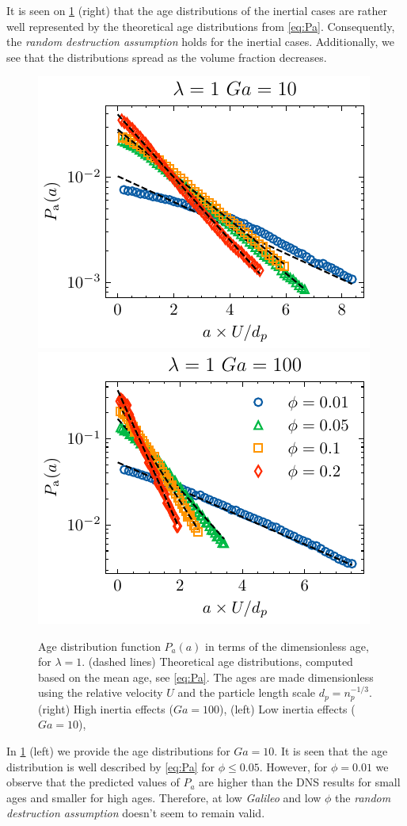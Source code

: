 It is seen on \ref{fig:age_picture} (right) that the age distributions of the inertial cases are rather well represented by the theoretical age distributions from \ref{eq:Pa}.
Consequently, the \textit{random destruction assumption} holds for the inertial cases. 
Additionally, we see that the distributions spread as the volume fraction decreases.
\begin{figure}[h!]
    \centering
    \includegraphics[height = 0.3\textwidth]{image/HOMOGENEOUS_NEW/Dist/Pa_l_1_Ga_10.pdf}
    \includegraphics[height = 0.3\textwidth]{image/HOMOGENEOUS_NEW/Dist/Pa_l_1_Ga_100.pdf}
    \caption{
    Age distribution function $P_a(a)$ in terms of the dimensionless age, for $\lambda = 1$.
    (dashed lines) Theoretical age distributions, computed based on the mean age, see \ref{eq:Pa}. 
    The ages are made dimensionless using the relative velocity $U$ and the particle length scale $d_p = n_p^{-1/3}$.  
    (right) High inertia effects ($Ga = 100$),
    (left) Low inertia effects ($Ga = 10$),
    }
    \label{fig:age_picture}
\end{figure}
In \ref{fig:age_picture} (left)  we provide the age distributions for $Ga = 10$. 
It is seen that the age distribution is well described by \ref{eq:Pa} for $\phi \le 0.05$.
However, for $\phi = 0.01$ we observe that the predicted values of $P_a$ are higher than the DNS results for small ages and smaller for high ages. 
Therefore, at low \textit{Galileo} and low $\phi$ the \textit{random destruction assumption} doesn't seem to remain valid. 
